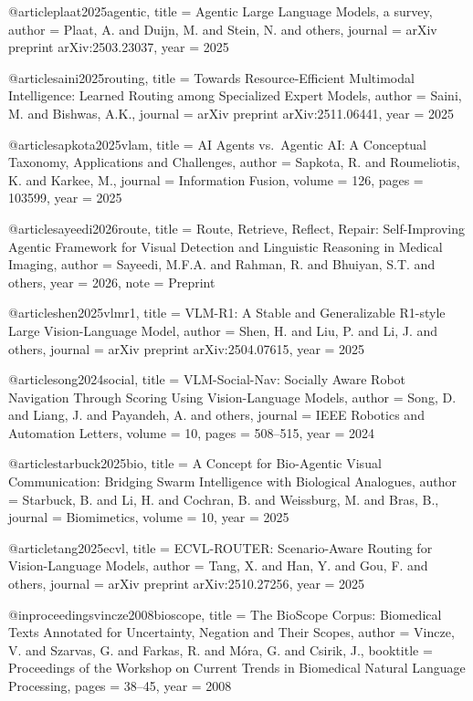 @article{plaat2025agentic,
  title   = {Agentic Large Language Models, a survey},
  author  = {Plaat, A. and Duijn, M. and Stein, N. and others},
  journal = {arXiv preprint arXiv:2503.23037},
  year    = {2025}
}

@article{saini2025routing,
  title   = {Towards Resource-Efficient Multimodal Intelligence: Learned Routing among Specialized Expert Models},
  author  = {Saini, M. and Bishwas, A.K.},
  journal = {arXiv preprint arXiv:2511.06441},
  year    = {2025}
}

@article{sapkota2025vlam,
  title   = {{AI} Agents vs.\ Agentic {AI}: A Conceptual Taxonomy, Applications and Challenges},
  author  = {Sapkota, R. and Roumeliotis, K. and Karkee, M.},
  journal = {Information Fusion},
  volume  = {126},
  pages   = {103599},
  year    = {2025}
}

@article{sayeedi2026route,
  title   = {Route, Retrieve, Reflect, Repair: Self-Improving Agentic Framework for Visual Detection and Linguistic Reasoning in Medical Imaging},
  author  = {Sayeedi, M.F.A. and Rahman, R. and Bhuiyan, S.T. and others},
  year    = {2026},
  note    = {Preprint}
}

@article{shen2025vlmr1,
  title   = {{VLM-R1}: A Stable and Generalizable {R1}-style Large Vision-Language Model},
  author  = {Shen, H. and Liu, P. and Li, J. and others},
  journal = {arXiv preprint arXiv:2504.07615},
  year    = {2025}
}

@article{song2024social,
  title   = {{VLM-Social-Nav}: Socially Aware Robot Navigation Through Scoring Using Vision-Language Models},
  author  = {Song, D. and Liang, J. and Payandeh, A. and others},
  journal = {IEEE Robotics and Automation Letters},
  volume  = {10},
  pages   = {508--515},
  year    = {2024}
}

@article{starbuck2025bio,
  title   = {A Concept for Bio-Agentic Visual Communication: Bridging Swarm Intelligence with Biological Analogues},
  author  = {Starbuck, B. and Li, H. and Cochran, B. and Weissburg, M. and Bras, B.},
  journal = {Biomimetics},
  volume  = {10},
  year    = {2025}
}

@article{tang2025ecvl,
  title   = {{ECVL-ROUTER}: Scenario-Aware Routing for Vision-Language Models},
  author  = {Tang, X. and Han, Y. and Gou, F. and others},
  journal = {arXiv preprint arXiv:2510.27256},
  year    = {2025}
}

@inproceedings{vincze2008bioscope,
  title   = {The {BioScope} Corpus: Biomedical Texts Annotated for Uncertainty, Negation and Their Scopes},
  author  = {Vincze, V. and Szarvas, G. and Farkas, R. and M{\'o}ra, G. and Csirik, J.},
  booktitle = {Proceedings of the Workshop on Current Trends in Biomedical Natural Language Processing},
  pages   = {38--45},
  year    = {2008}
}

